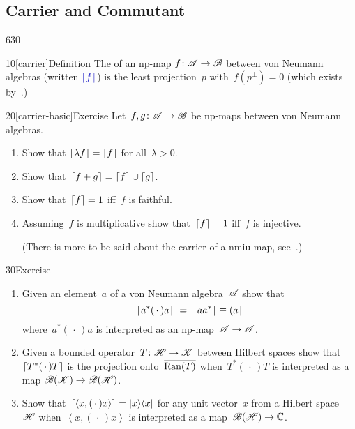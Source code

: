 \subsection{Carrier and Commutant}
\begin{parsec}{630}%
\begin{point}{10}[carrier]{Definition}%
The %
of an np-map $f\colon \mathscr{A}\to\mathscr{B}$
between von Neumann algebras
(written $\Define{\ceil{f}}$)%
is the least projection~$p$
with~$f(p^\perp)=0$
(which exists by~.)
\end{point}
\begin{point}{20}[carrier-basic]{Exercise}%
Let~$f,g\colon \mathscr{A}\to\mathscr{B}$
be np-maps between von Neumann algebras.
\begin{enumerate}
\item
Show that $\left\lceil\lambda f\right\rceil=\left\lceil f\right\rceil$
for all~$\lambda>0$.
\item
Show that~$\left\lceil f+g\right\rceil=\left\lceil f\right\rceil\cup\left\lceil g\right\rceil$.
\item
Show that~$\left\lceil f\right\rceil=1$ iff~$f$ is faithful.
\item
Assuming~$f$ is multiplicative
show that~$\left\lceil f\right\rceil=1$ iff~$f$ is injective.

(There is more to be said about
the carrier of a nmiu-map, see~.)
\end{enumerate}
\end{point}
\begin{point}{30}{Exercise}%
\begin{enumerate}
\item
Given an element~$a$ of a von Neumann algebra~$\mathscr{A}$
show that 
\begin{equation*}
\ceil{a^*(\,\cdot\,)a}\ =\ \ceil{aa^*}\equiv \ceilr{a}
\end{equation*}
where~$a^*(\,\cdot\,)a$
is interpreted as an np-map~$\mathscr{A}\to\mathscr{A}$.
\item
Given a bounded operator~$T\colon \mathscr{H}\to\mathscr{K}$
between Hilbert spaces
show that~$\left\lceil T^*(\,\cdot\,)T\right\rceil$
is the projection onto~$\overline{\operatorname{Ran}(T)}$
when~$T^*(\,\cdot\,)T$
is interpreted 
as a map
$\mathscr{B}(\mathscr{K})\to\mathscr{B}(\mathscr{H})$.
\item
Show that~$\left\lceil\left<x,(\,\cdot\,)x\right>\right\rceil=\left|x\right>\!\left<x\right|$
for any unit vector~$x$ from a Hilbert space~$\mathscr{H}$
when~$\left<x,(\,\cdot\,)x\right>$
is interpreted as a map~$\mathscr{B}(\mathscr{H})\to\mathbb{C}$.


\end{enumerate}
\end{point}
\end{parsec}

